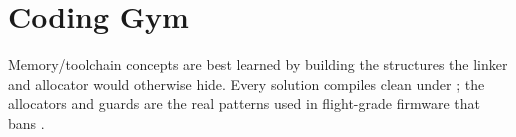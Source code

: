 \section{Coding Gym}

\begin{partnote}
Memory/toolchain concepts are best learned by building the structures the
linker and allocator would otherwise hide. Every solution compiles clean under
; the allocators and guards are the real
patterns used in flight-grade firmware that bans .
\end{partnote}

